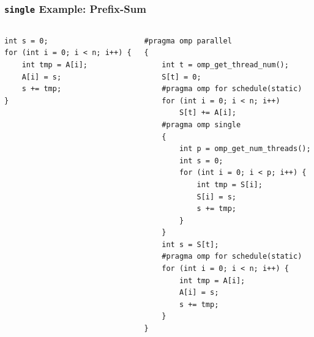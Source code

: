 \documentclass{beamer}
\begin{document}
\begin{frame}[fragile=singleslide]
  \frametitle{\texttt{single} Example: Prefix-Sum}

  \vspace*{-4ex}
\begin{columns}[t]
  \column{4.5cm}
\begin{verbatim}
int s = 0;
for (int i = 0; i < n; i++) {
    int tmp = A[i];
    A[i] = s;
    s += tmp;
}
\end{verbatim}
  
  \column{6cm}
  
\begin{verbatim}
#pragma omp parallel
{
    int t = omp_get_thread_num();
    S[t] = 0;
    #pragma omp for schedule(static)
    for (int i = 0; i < n; i++)
        S[t] += A[i];
    #pragma omp single
    {
        int p = omp_get_num_threads();
        int s = 0;
        for (int i = 0; i < p; i++) {
            int tmp = S[i];
            S[i] = s;
            s += tmp;
        }
    }
    int s = S[t];
    #pragma omp for schedule(static)
    for (int i = 0; i < n; i++) {
        int tmp = A[i];
        A[i] = s;
        s += tmp;
    }
}
\end{verbatim}
\end{columns}
\end{frame}







  
\end{document}
